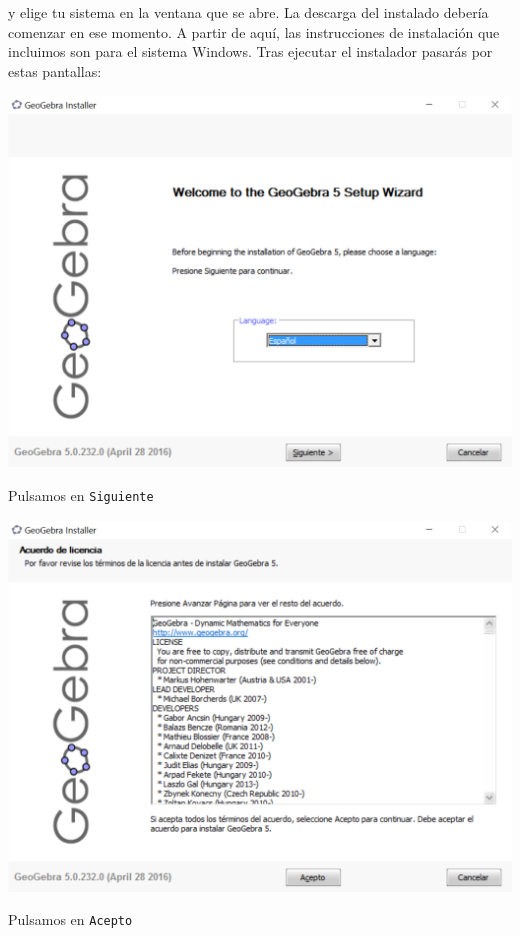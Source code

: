 \documentclass[10pt,a4paper]{article}\usepackage[]{graphicx}\usepackage[]{color}
\begin{document}
y elige tu sistema en la ventana que se abre. La descarga del instalado debería comenzar en ese
momento. A partir de aquí, las instrucciones de instalación que incluimos son para el sistema
Windows. Tras ejecutar el instalador pasarás por estas pantallas:
    \begin{center}
    \includegraphics[width=14cm]{../fig/Tut00-GeoGebraSetup01-201605.png}
    \end{center}
Pulsamos en {\tt Siguiente}
    \begin{center}
    \includegraphics[width=14cm]{../fig/Tut00-GeoGebraSetup02-201605.png}
    \end{center}
Pulsamos en {\tt Acepto}
\end{document}
